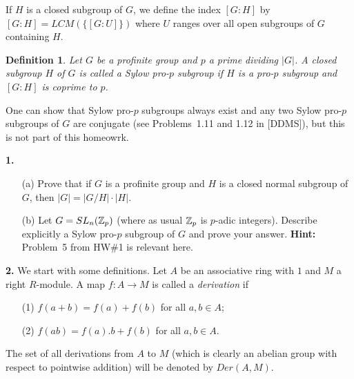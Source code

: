 \documentclass[12pt]{amsart}
\newtheorem* {Definition}    {Definition}
\begin{document}
If $H$ is a closed subgroup of $G$, we define the index $[G:H]$ by $[G:H]=LCM(\{[G:U]\})$ where $U$ ranges over all open subgroups of $G$
containing $H$.

\begin{Definition}\rm Let $G$ be a profinite group and $p$ a prime dividing $|G|$. A closed subgroup $H$ of $G$ is called a 
{\it Sylow pro-$p$ subgroup} if $H$ is a pro-$p$ subgroup and $[G:H]$ is coprime to $p$.
\end{Definition}
One can show that Sylow pro-$p$ subgroups always exist and any two Sylow pro-$p$ subgroups of $G$ are conjugate (see Problems~1.11 and 1.12 in [DDMS]), but this is not part of this homeowrk.


{\bf 1.} 
\begin{itemize}
\item[(a)] Prove that if $G$ is a profinite group and $H$ is a closed normal subgroup of $G$, then $|G|=|G/H|\cdot |H|$.
\item[(b)] Let $G=SL_n({\mathbb Z}_p)$ (where as usual ${\mathbb Z}_p$ is $p$-adic integers). Describe explicitly a Sylow pro-$p$ subgroup of $G$
and prove your answer. {\bf Hint:} Problem~5 from HW\#1 is relevant here.
\end{itemize}
\skv

{\bf 2.} We start with some definitions. Let $A$ be an associative ring with $1$ and $M$ a right $R$-module. A map $f:A\to M$
is called a {\it derivation} if
\begin{itemize}  
\item[(1)] $f(a+b)=f(a)+f(b)$ for all $a,b\in A$;
\item[(2)] $f(ab)=f(a).b+f(b)$ for all $a,b\in A$.
\end{itemize}
The set of all derivations from $A$ to $M$ (which is clearly an abelian group with respect to pointwise addition) will be denoted
by $Der(A,M)$.
\end{document}

